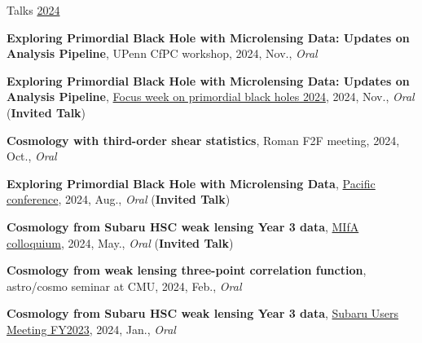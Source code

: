 \begin{rSection}{Talks}
\underline{2024}
\begin{etaremune}
\setcounter{enumi}{42}
\item \textbf{Exploring Primordial Black Hole with Microlensing Data: Updates on Analysis Pipeline}, UPenn CfPC workshop, 2024, Nov., \textit{Oral}
\item \textbf{Exploring Primordial Black Hole with Microlensing Data: Updates on Analysis Pipeline}, \href{https://indico.ipmu.jp/event/439/overview}{Focus week on primordial black holes 2024}, 2024, Nov., \textit{Oral} (\textbf{Invited Talk})
\item \textbf{Cosmology with third-order shear statistics}, Roman F2F meeting, 2024, Oct., \textit{Oral}
\item \textbf{Exploring Primordial Black Hole with Microlensing Data}, \href{https://pacific-conference.pa.ucla.edu/index.html}{Pacific conference}, 2024, Aug., \textit{Oral} (\textbf{Invited Talk})
\item \textbf{Cosmology from Subaru HSC weak lensing Year 3 data}, \href{https://cse.umn.edu/physics/minnesota-institute-astrophysics-mifa-colloquium}{MIfA colloquium}, 2024, May., \textit{Oral} (\textbf{Invited Talk})
\item \textbf{Cosmology from weak lensing three-point correlation function}, astro/cosmo seminar at CMU, 2024, Feb., \textit{Oral}
\item \textbf{Cosmology from Subaru HSC weak lensing Year 3 data}, \href{https://www.subarutelescope.org/Science/SubaruUM/SubaruUM2023/index.html}{Subaru Users Meeting FY2023}, 2024, Jan., \textit{Oral}
\end{etaremune}


\end{rSection}
